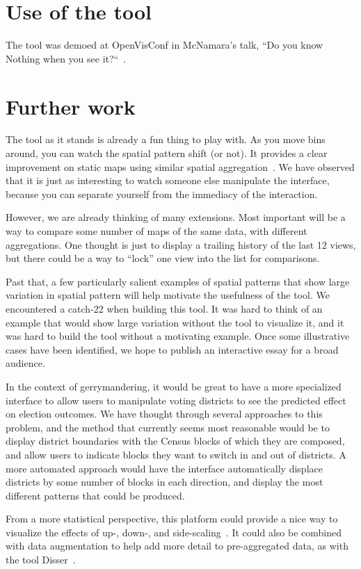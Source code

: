 \documentclass{article}\usepackage[]{graphicx}\usepackage[]{color}
\begin{document}
\section{Use of the tool}
The tool was demoed at OpenVisConf in McNamara's talk, ``Do you know Nothing when you see it?``~\citep{McN2016f}. 


\section{Further work}

The tool as it stands is already a fun thing to play with. As you move bins around, you can watch the spatial pattern shift (or not). It provides a clear improvement on static maps using similar spatial aggregation~\citep{SulTelWoo2008, Fel2015}. We have observed that it is just as interesting to watch someone else manipulate the interface, because you can separate yourself from the immediacy of the interaction. 

However, we are already thinking of many extensions. Most important will be a way to compare some number of maps of the same data, with different aggregations. One thought is just to display a trailing history of the last 12 views, but there could be a way to ``lock'' one view into the list for comparisons. 

Past that, a few particularly salient examples of spatial patterns that show large variation in spatial pattern will help motivate the usefulness of the tool. We encountered a catch-22 when building this tool. It was hard to think of an example that would show large variation without the tool to visualize it, and it was hard to build the tool without a motivating example. Once some illustrative cases have been identified, we hope to publish an interactive essay for a broad audience. 

In the context of gerrymandering, it would be great to have a more specialized interface to allow users to manipulate voting districts to see the predicted effect on election outcomes. We have thought through several approaches to this problem, and the method that currently seems most reasonable would be to display district boundaries with the Census blocks of which they are composed, and allow users to indicate blocks they want to switch in and out of districts. A more automated approach would have the interface automatically displace districts by some number of blocks in each direction, and display the most different patterns that could be produced. 

From a more statistical perspective, this platform could provide a nice way to visualize the effects of up-, down-, and side-scaling~\citep{Atk2013, Kyr2004}. It could also be combined with data augmentation to help add more detail to pre-aggregated data, as with the tool Disser~\citep{Mar2014}. 

\clearpage



 


\end{document}
